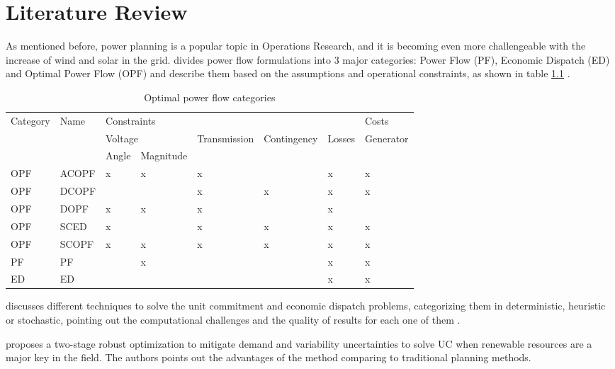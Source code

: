\documentclass[12pt,LUDisStyle,twosided]{book}
\begin{document}
\chapter{Literature Review}


As mentioned before, power planning is a popular topic in Operations Research, and it is becoming even more challengeable with the increase of wind and solar in the grid. \citeauthor{cain} divides power flow formulations into 3 major categories: Power Flow (PF), Economic Dispatch (ED) and Optimal Power Flow (OPF) and describe them based on the assumptions and operational constraints, as shown in table \ref{table:PowerSystemsCat} \cite{cain}.

\begin{table}[h]
\centering
\caption{Optimal power flow categories \cite{cain}}
\label{table:PowerSystemsCat}
\begin{tabular}{|l|l|l|l|l|l|l|l|}
\hline
\multirow{3}{*}{Category} & \multirow{3}{*}{Name} & \multicolumn{5}{l|}{Constraints} & Costs \\ \cline{3-8} 
 &  & \multicolumn{2}{l|}{Voltage} & \multirow{2}{*}{Transmission} & \multirow{2}{*}{Contingency} & \multirow{2}{*}{Losses} & \multirow{2}{*}{Generator} \\ \cline{3-4}
 &  & Angle & Magnitude &  &  &  &  \\ \hline
OPF & ACOPF & x & x & x &  & x & x \\ \hline
OPF & DCOPF &  &  & x & x & x & x \\ \hline
OPF & DOPF & x & x & x &  & x &  \\ \hline
OPF & SCED & x &  & x & x & x & x \\ \hline
OPF & SCOPF & x & x & x & x & x & x \\ \hline
PF & PF &  & x &  &  & x & x \\ \hline
ED & ED &  &  &  &  & x & x \\ \hline
\end{tabular}
\end{table}


\citeauthor{yamin} discusses different techniques to solve the unit commitment and economic dispatch problems, categorizing them in deterministic, heuristic or stochastic, pointing out the computational challenges and the quality of results for each one of them \cite{yamin}. 

\citeauthor{bertsimas} proposes a two-stage robust optimization to mitigate demand and variability uncertainties to solve UC when renewable resources are a major key in the field. The authors points out the advantages of the method comparing to traditional planning methods. \cite{bertsimas}
\end{document}
